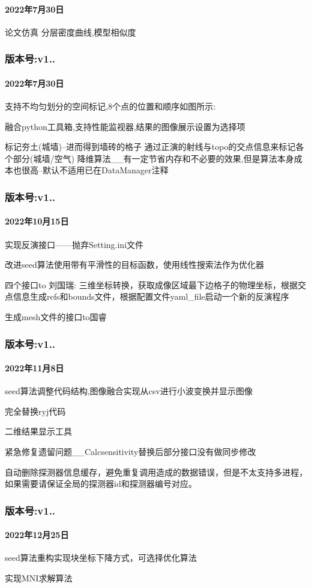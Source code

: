 \paragraph*{2022年7月30日}

论文仿真 分层密度曲线,模型相似度

\subsubsection*{版本号\+:v1..}

\paragraph*{2022年7月30日}

支持不均匀划分的空间标记,8个点的位置和顺序如图所示\+:



融合python工具箱,支持性能监视器,结果的图像展示设置为选择项

标记夯土(城墙)--进而得到墙砖的格子 通过正演的射线与topo的交点信息来标记各个部分(城墙/空气) 降维算法\+\_\+\+\_\+有一定节省内存和不必要的效果,但是算法本身成本也很高--默认不适用已在\+Data\+Manager注释

\subsubsection*{版本号\+:v1..}

\paragraph*{2022年10月15日}

实现反演接口——抛弃\+Setting.\+ini文件

改进seed算法使用带有平滑性的目标函数，使用线性搜索法作为优化器

四个接口to 刘国瑞\+: 三维坐标转换，获取成像区域最下边格子的物理坐标，根据交点信息生成refs和bounds文件，根据配置文件yaml\+\_\+file启动一个新的反演程序

生成mesh文件的接口to国睿

\subsubsection*{版本号\+:v1..}

\paragraph*{2022年11月8日}

seed算法调整代码结构,图像融合实现从csv进行小波变换并显示图像

完全替换ryj代码

二维结果显示工具

紧急修复遗留问题\+\_\+\+\_\+\+Calcsensitivity替换后部分接口没有做同步修改

自动删除探测器信息缓存，避免重复调用造成的数据错误，但是不太支持多进程，如果需要请保证全局的探测器id和探测器编号对应。

\subsubsection*{版本号\+:v1..}

\paragraph*{2022年12月25日}

seed算法重构实现块坐标下降方式，可选择优化算法

实现\+M\+N\+I求解算法 